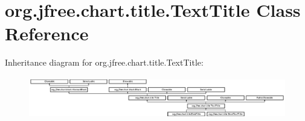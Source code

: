 \hypertarget{classorg_1_1jfree_1_1chart_1_1title_1_1_text_title}{}\section{org.\+jfree.\+chart.\+title.\+Text\+Title Class Reference}
\label{classorg_1_1jfree_1_1chart_1_1title_1_1_text_title}
Inheritance diagram for org.\+jfree.\+chart.\+title.\+Text\+Title\+:\begin{figure}[H]
\begin{center}
\leavevmode
\includegraphics[height=1.834862cm]{classorg_1_1jfree_1_1chart_1_1title_1_1_text_title}
\end{center}
\end{figure}
